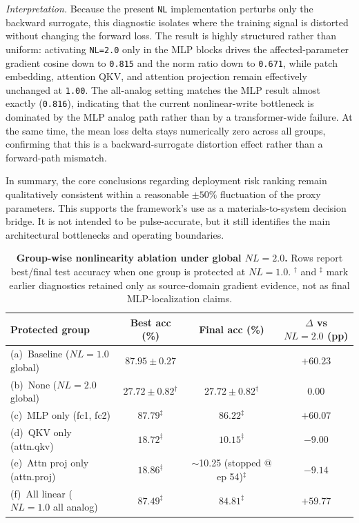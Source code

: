 \textit{Interpretation.} Because the present \texttt{NL} implementation perturbs only the backward surrogate, this diagnostic isolates where the training signal is distorted without changing the forward loss. The result is highly structured rather than uniform: activating \texttt{NL=2.0} only in the MLP blocks drives the affected-parameter gradient cosine down to \texttt{0.815} and the norm ratio down to \texttt{0.671}, while patch embedding, attention QKV, and attention projection remain effectively unchanged at \texttt{1.00}. The all-analog setting matches the MLP result almost exactly (\texttt{0.816}), indicating that the current nonlinear-write bottleneck is dominated by the MLP analog path rather than by a transformer-wide failure. At the same time, the mean loss delta stays numerically zero across all groups, confirming that this is a backward-surrogate distortion effect rather than a forward-path mismatch.

In summary, the core conclusions regarding deployment risk ranking remain qualitatively consistent within a reasonable $\pm 50\%$ fluctuation of the proxy parameters. This supports the framework's use as a materials-to-system decision bridge. It is not intended to be pulse-accurate, but it still identifies the main architectural bottlenecks and operating boundaries.


\begin{table}[ht]
    \centering
    \caption{\textbf{Group-wise nonlinearity ablation under global $NL=2.0$.} Rows report best/final test accuracy when one group is protected at $NL=1.0$. $^\dagger$ and $^\ddagger$ mark earlier diagnostics retained only as source-domain gradient evidence, not as final MLP-localization claims.}
    \label{tab:supp-nl-ablation}
    \small
    \setlength{\tabcolsep}{5pt}
    \begin{tabular}{@{}lccc@{}}
        \toprule
        Protected group & Best acc (\%) & Final acc (\%) & $\Delta$ vs $NL=2.0$ (pp) \\
        \midrule
        (a)~Baseline ($NL=1.0$ global) & $87.95\pm0.27$ & \notrun{} & $+60.23$ \\
        (b)~None ($NL=2.0$ global) & $27.72\pm0.82^\dagger$ & $27.72\pm0.82^\dagger$ & $0.00$ \\
        (c)~MLP only (fc1, fc2) & $87.79^\ddagger$ & $86.22^\ddagger$ & $+60.07$ \\
        (d)~QKV only (attn.qkv) & $18.72^\ddagger$ & $10.15^\ddagger$ & $-9.00$ \\
        (e)~Attn proj only (attn.proj) & $18.86^\ddagger$ & $\sim$10.25 (stopped @ ep 54)$^\ddagger$ & $-9.14$ \\
        (f)~All linear ($NL=1.0$ all analog) & $87.49^\ddagger$ & $84.81^\ddagger$ & $+59.77$ \\
        \bottomrule
    \end{tabular}
\end{table}

